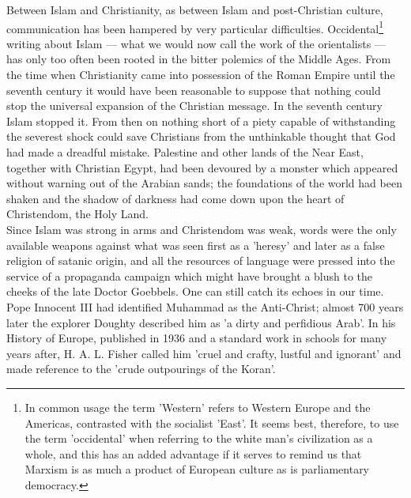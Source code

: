 \documentclass[11pt, b5paper, twoside]{book}
\begin{document}
Between Islam and Christianity, as between Islam and post-Christian culture, communication has been hampered by very particular difficulties. Occidental\footnote{In common usage the term 'Western' refers to Western Europe and the Americas, contrasted with the socialist 'East'. It seems best, therefore, to use the term 'occidental' when referring to the white man's civilization as a whole, and this has an added advantage if it serves to remind us that Marxism is as much a product of European culture as is parliamentary democracy.} writing about Islam --- what we would now call the work of the orientalists --- has only too often been rooted in the bitter polemics of the Middle Ages. From the time when Christianity came into possession of the Roman Empire until the seventh century it would have been reasonable to suppose that nothing could stop the universal expansion of the Christian message. In the seventh century Islam stopped it. From then on nothing short of a piety capable of withstanding the severest shock could save Christians from the unthinkable thought that God had made a dreadful mistake. Palestine and other lands of the Near East, together with Christian Egypt, had been devoured by a monster which appeared without warning out of the Arabian sands; the foundations of the world had been shaken and the shadow of darkness had come down upon the heart of Christendom, the Holy Land. \\

Since Islam was strong in arms and Christendom was weak, words were the only available weapons against what was seen first as a 'heresy' and later as a false religion of satanic origin, and all the resources of language were pressed into the service of a propaganda campaign which might have brought a blush to the cheeks of the late Doctor Goebbels. One can still catch its echoes in our time. Pope Innocent III had identified Muhammad as the Anti-Christ; almost 700 years later the explorer Doughty described him as 'a dirty and perfidious Arab'. In his History of Europe, published in 1936 and a standard work in schools for many years after, H. A. L. Fisher called him 'cruel and crafty, lustful and ignorant' and made reference to the 'crude outpourings of the Koran'. \\
\end{document}
